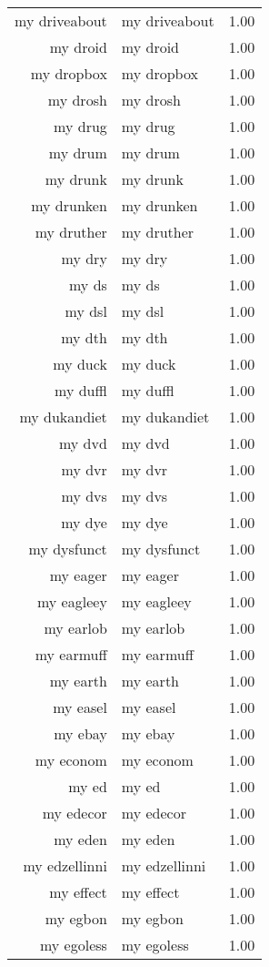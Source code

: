 \begin{table}[ht]
\begin{tabular}{rlr}
  my driveabout & my driveabout & 1.00 \\ 
  my droid & my droid & 1.00 \\ 
  my dropbox & my dropbox & 1.00 \\ 
  my drosh & my drosh & 1.00 \\ 
  my drug & my drug & 1.00 \\ 
  my drum & my drum & 1.00 \\ 
  my drunk & my drunk & 1.00 \\ 
  my drunken & my drunken & 1.00 \\ 
  my druther & my druther & 1.00 \\ 
  my dry & my dry & 1.00 \\ 
  my ds & my ds & 1.00 \\ 
  my dsl & my dsl & 1.00 \\ 
  my dth & my dth & 1.00 \\ 
  my duck & my duck & 1.00 \\ 
  my duffl & my duffl & 1.00 \\ 
  my dukandiet & my dukandiet & 1.00 \\ 
  my dvd & my dvd & 1.00 \\ 
  my dvr & my dvr & 1.00 \\ 
  my dvs & my dvs & 1.00 \\ 
  my dye & my dye & 1.00 \\ 
  my dysfunct & my dysfunct & 1.00 \\ 
  my eager & my eager & 1.00 \\ 
  my eagleey & my eagleey & 1.00 \\ 
  my earlob & my earlob & 1.00 \\ 
  my earmuff & my earmuff & 1.00 \\ 
  my earth & my earth & 1.00 \\ 
  my easel & my easel & 1.00 \\ 
  my ebay & my ebay & 1.00 \\ 
  my econom & my econom & 1.00 \\ 
  my ed & my ed & 1.00 \\ 
  my edecor & my edecor & 1.00 \\ 
  my eden & my eden & 1.00 \\ 
  my edzellinni & my edzellinni & 1.00 \\ 
  my effect & my effect & 1.00 \\ 
  my egbon & my egbon & 1.00 \\ 
  my egoless & my egoless & 1.00 \\ 

\end{tabular}
\end{table}
